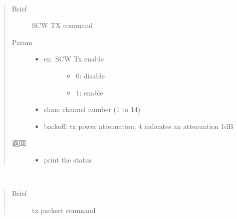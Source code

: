 \documentclass[letterpaper,10pt,english]{sphinxhowto}
\begin{document}
\begin{fulllineitems}

\begin{fulllineitems}
\label{\detokenize{rfapi/index:wifi_api.WIFIAPI.wifiscwout}}~\begin{quote}\begin{description}
\item[{Brief}] \leavevmode
SCW TX command

\item[{Param}] \leavevmode\begin{itemize}
\item {} \begin{description}
\item[{en: SCW Tx enable}] \leavevmode\begin{itemize}
\item {} 
0: disable

\item {} 
1: enable

\end{itemize}

\end{description}

\item {} 
chan: channel number (1 to 14)

\item {} 
backoff: tx power attenuation, 4 indicates an attenuation 1dB

\end{itemize}

\item[{返回}] \leavevmode
\begin{itemize}
\item {} 
print the status

\end{itemize}


\end{description}\end{quote}

\end{fulllineitems}


\begin{fulllineitems}
\label{\detokenize{rfapi/index:wifi_api.WIFIAPI.wifitxout}}~\begin{quote}\begin{description}
\item[{Brief}] \leavevmode
tx packect command


\end{description}
\end{quote}
\end{fulllineitems}
\end{fulllineitems}
\end{document}
